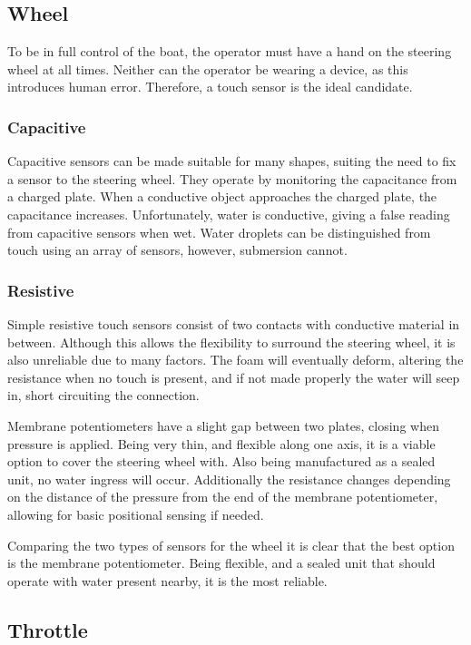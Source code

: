 \documentclass[10pt]{ecsprogressreport}
\begin{document}
\subsection{Wheel}

To be in full control of the boat, the operator must have a hand on the steering wheel at all times. Neither can the operator be wearing a device, as this introduces human error. Therefore, a touch sensor is the ideal candidate. 
\subsubsection{Capacitive}

Capacitive sensors can be made suitable for many shapes, suiting the need to fix a sensor to the steering wheel. They operate by monitoring the capacitance from a charged plate. When a conductive object approaches the charged plate, the capacitance increases. Unfortunately, water is conductive, giving a false reading from capacitive sensors when wet. Water droplets can be distinguished from touch using an array of sensors, however, submersion cannot\cite{}.

\subsubsection{Resistive}

Simple resistive touch sensors consist of two contacts with conductive material in between. Although this allows the flexibility to surround the steering wheel, it is also unreliable due to many factors. The foam will eventually deform, altering the resistance when no touch is present, and if not made properly the water will seep in, short circuiting the connection.

Membrane potentiometers have a slight gap between two plates, closing when pressure is applied. Being very thin, and flexible along one axis, it is a viable option to cover the steering wheel with. Also being manufactured as a sealed unit, no water ingress will occur. Additionally the resistance changes depending on the distance of the pressure from the end of the membrane potentiometer, allowing for basic positional sensing if needed.


Comparing the two types of sensors for the wheel it is clear that the best option is the membrane potentiometer. Being flexible, and a sealed unit that should operate with water present nearby, it is the most reliable.
   
\subsection{Throttle}
\end{document}
